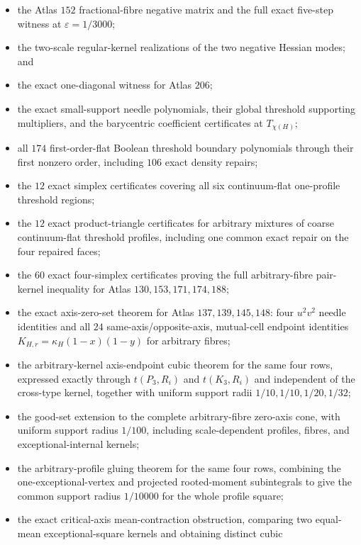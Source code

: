 \documentclass[11pt]{article}
\begin{document}
\begin{itemize}
 inequality, and the arbitrary-kernel type-III endpoint analysis;
 \item the Atlas $152$ fractional-fibre negative matrix and the full exact
 five-step witness at $\varepsilon=1/3000$;
 \item the two-scale regular-kernel realizations of the two negative Hessian
 modes; and
 \item the exact one-diagonal witness for Atlas $206$;
 \item the exact small-support needle polynomials, their global threshold
 supporting multipliers, and the barycentric coefficient certificates at
 $T_{\chi(H)}$;
 \item all $174$ first-order-flat Boolean threshold boundary polynomials
 through their first nonzero order, including $106$ exact density repairs;
 \item the $12$ exact simplex certificates covering all six continuum-flat
 one-profile threshold regions;
 \item the $12$ exact product-triangle certificates for arbitrary mixtures
 of coarse continuum-flat threshold profiles, including one common exact
 repair on the four repaired faces;
 \item the $60$ exact four-simplex certificates proving the full
  arbitrary-fibre pair-kernel inequality for Atlas $130,153,171,174,188$;
 \item the exact axis-zero-set theorem for Atlas $137,139,145,148$: four
  $u^2v^2$ needle identities and all $24$ same-axis/opposite-axis,
  mutual-cell endpoint identities
  $K_{H,r}=\kappa_H(1-x)(1-y)$ for arbitrary fibres;
 \item the arbitrary-kernel axis-endpoint cubic theorem for the same four
  rows, expressed exactly through $t(P_3,R_i)$ and $t(K_3,R_i)$ and
  independent of the cross-type kernel, together with uniform support radii
  $1/10,1/10,1/20,1/32$;
 \item the good-set extension to the complete arbitrary-fibre zero-axis cone,
  with uniform support radius $1/100$, including scale-dependent profiles,
  fibres, and exceptional-internal kernels;
 \item the arbitrary-profile gluing theorem for the same four rows, combining
  the one-exceptional-vertex and projected rooted-moment subintegrals to give
  the common support radius $1/10000$ for the whole profile square;
 \item the exact critical-axis mean-contraction obstruction, comparing two
  equal-mean exceptional-square kernels and obtaining distinct cubic

\end{itemize}
\end{document}
